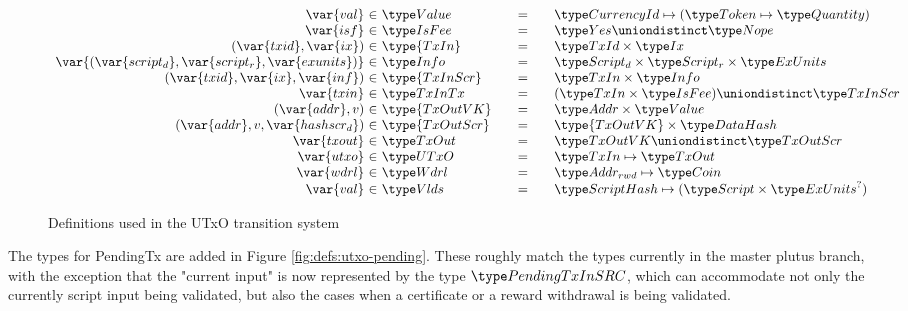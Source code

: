 \begin{figure*}[htb]
\begin{equation*}
\begin{array}{r@{~\in~}l@{\qquad=\qquad}lr}
      \var{val} & \Value
      & \CurrencyId \mapsto (\Token \mapsto \Quantity)
      \\
      \var{isf}
      & \IsFee
      & \Yes \uniondistinct \Nope
      \\
      (\var{txid}, \var{ix})
      & \type{TxIn}
      & \TxId \times \Ix
      \\
      \var{(\var{script_d},\var{script_r},\var{exunits})}
      & \Info
      & \ScriptD \times \ScriptR \times \ExUnits
      \\
      (\var{txid}, \var{ix}, \var{inf})
      & \type{TxInScr}
      & \TxIn \times \Info
      \\
      \var{txin}
      & \TxInTx
      & (\TxIn \times \IsFee) \uniondistinct \TxInScr
      \\
      (\var{addr}, v)
      & \type{TxOutVK}
      & \Addr \times \Value
      \\
      (\var{addr}, v, \var{hashscr_d})
      & \type{TxOutScr}
      & \type{TxOutVK} \times \HashDat
      \\
      \var{txout}
      & \TxOut
      & \TxOutVK \uniondistinct \TxOutScr
      \\
      \var{utxo}
      & \UTxO
      & \TxIn \mapsto \TxOut
      \\
      \var{wdrl}
      & \Wdrl
      & \AddrRWD \mapsto \Coin
      \\
      \var{val}
      & \Vlds
      & \HashScr \mapsto (\Script \times \ExUnits^?)
    \end{array}
  \end{equation*}
  \caption{Definitions used in the UTxO transition system}
  \label{fig:defs:utxo-shelley-1}
\end{figure*}

The types for PendingTx are added in Figure \ref{fig:defs:utxo-pending}.
These roughly match the types currently in the master plutus branch,
with the exception that the "current input" is now represented by the type
$\PendingTxInSRC$, which can accommodate not only the currently script input
being validated, but also the cases when a certificate or a reward withdrawal
is being validated.

